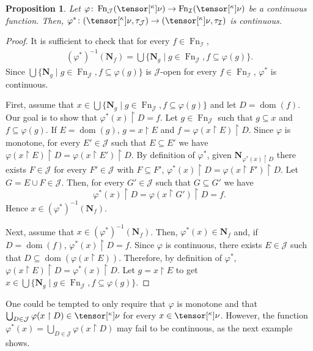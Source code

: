 \documentclass{amsart}
\numberwithin{equation}{section}
\newcommand{\I}{\mathcal{I}}
\newcommand{\J}{\mathcal{J}}
\newcommand{\pre}[2]{\tensor[^{#1}]{#2}{}}
\newcommand{\Nbhd}{\boldsymbol{N}}
\newcommand{\1}{\mathbf{I}}
\newcommand{\2}{\mathbf{II}}
\renewcommand{\k}{\kappa}
\renewcommand{\phi}{\varphi}
\DeclareMathOperator{\dom}{dom}
\DeclareMathOperator{\Fn}{Fn}
\newcommand{\clopen}[1]{\Nbhd_{#1}}
\newtheorem{proposition}[theorem]{Proposition}
\theoremstyle{definition}
\theoremstyle{remark}
\begin{document}
\begin{proposition}\label{prop:cont} 
Let  $\varphi \colon \Fn_\J( \pre{\k}{\nu} ) \to \Fn_\I( \pre{\k}{\nu} )$ be a continuous function. Then, \( \varphi^* \colon (\pre{\k}{\nu}, \tau_\J) \to (\pre{\k}{\nu}, \tau_\I) \) is continuous.
\end{proposition}
\begin{proof}
It is sufficient to check that for every \(f \in \Fn_\I\),
\begin{align*}
(\phi^*)^{-1}(\Nbhd_f)=\bigcup\{\Nbhd_g \mid g \in \Fn_\J, f \subseteq \phi(g)\}.
\end{align*}
Since $\bigcup\{\Nbhd_g \mid  g \in \Fn_\J, f \subseteq \phi(g)\}$ is \(\J\)-open for every \(f \in \Fn_\I\), \(\phi^*\) is continuous. 

First, assume that \(x \in \bigcup\{\Nbhd_g \mid g \in \Fn_\J, f \subseteq \phi(g)\} \) and let \(D=\dom(f)\). Our goal is to show that \(\phi^*(x)\restriction D=f\). Let \(g \in \Fn_\J\) such that \(g \subseteq x \) and \(f \subseteq \phi(g)\). If \(E=\dom(g)\), \(g=x \restriction E\) and \(f = \phi(x \restriction E) \restriction D\). Since \(\phi\) is monotone, for every \(E' \in \J\) such that \(E \subseteq E'\) we have \(\phi(x\restriction E)\restriction D = \phi(x\restriction E') \restriction D\).
By definition of \(\phi^*\), given \(\clopen{\phi^*(x)\restriction D}\)  there exists \(F\in \J\) for every \(F'\in \J\) with \(F \subseteq F'\), \(\phi^*(x)\restriction D = \phi(x \restriction F') \restriction D\). Let \(G= E \cup F \in \J \). Then, for every  \(G' \in \J\) such that \(G \subseteq G'\)
we have 
\[
\phi^*(x) \restriction D= \phi(x \restriction G') \restriction D =f.\] 
Hence \(x \in (\phi^*)^{-1}(\Nbhd_f)\). 

Next, assume that \(x \in (\phi^*)^{-1}(\Nbhd_f)\). Then, \(\phi^*(x)\in \Nbhd_f\) and, if \(D=\dom(f)\), \(\phi^*(x) \restriction D =f\). Since \(\phi\) is continuous,
there exists \(E \in \J \) such that
$D\subseteq \dom(\varphi(x\restriction E))$. Therefore, by definition of \(\phi^*\),
$\varphi(x\restriction E) \restriction D =\phi^*(x)\restriction D$. 
Let \(g=x \restriction E\) to get \(x \in \bigcup\{\Nbhd_g \mid g \in \Fn_\J, f \subseteq \phi(g)\}\).
\end{proof}




One could be tempted to only require that $\varphi$ is monotone and that  \(\bigcup_{D\in \J}\phi(x\restriction D) \in \pre{\k}{\nu}\) for every \(x \in \pre{\k}{\nu}\). However, the function \(\phi^*(x)=\bigcup_{D\in \J}\phi(x\restriction D)\) may fail to be continuous, as the next example shows. 
\end{document}
